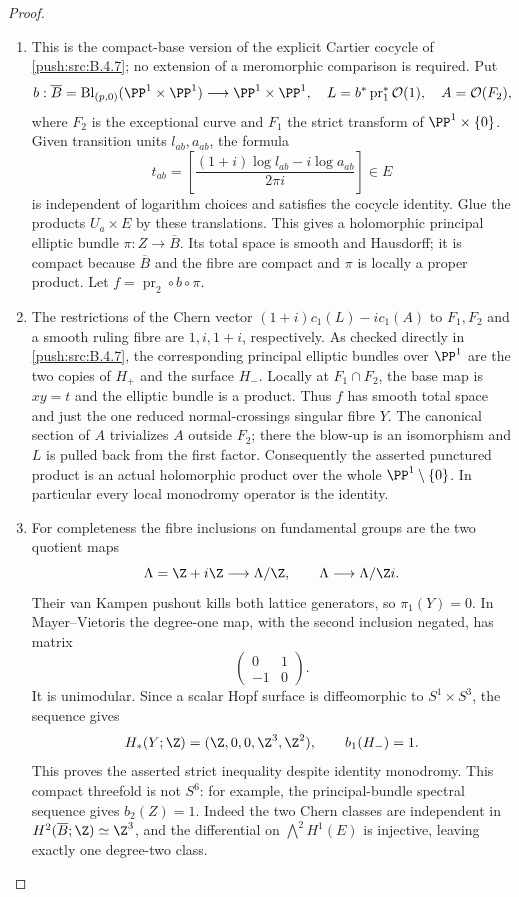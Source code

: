 \begin{proof}
\begin{enumerate}[label=\arabic*.,leftmargin=*]
\item This is the compact-base version of the explicit Cartier cocycle
of \ref{push:src:B.4.7}; no extension of a meromorphic comparison is required.
Put
\[
 b:\overline B=\operatorname{Bl}_{(p,0)}(\PP^1\times\PP^1)
      \longrightarrow\PP^1\times\PP^1,
 \quad L=b^*\operatorname{pr}_1^*\mathcal O(1),
 \quad A=\mathcal O(F_2),
\]
where $F_2$ is the exceptional curve and $F_1$ the strict transform
of $\PP^1\times\{0\}$.  Given transition units $l_{ab},a_{ab}$,
the formula
\[
 t_{ab}=\left[
 \frac{(1+i)\log l_{ab}-i\log a_{ab}}{2\pi i}
 \right]\in E
\]
is independent of logarithm choices and satisfies the cocycle
identity.  Glue the products $U_a\times E$ by these translations.
This gives a holomorphic principal elliptic bundle
$\pi:Z\to\overline B$.  Its total space is smooth and Hausdorff;
it is compact because $\overline B$ and the fibre are compact and
$\pi$ is locally a proper product.  Let
$f=\operatorname{pr}_2\circ b\circ\pi$.

\item The restrictions of the Chern vector
$(1+i)c_1(L)-i c_1(A)$ to $F_1,F_2$ and a smooth ruling fibre
are $1,i,1+i$, respectively.  As checked directly in \ref{push:src:B.4.7},
the corresponding principal elliptic bundles over $\PP^1$
are the two copies of $H_+$ and the surface $H_-$.  Locally
at $F_1\cap F_2$, the base map is $xy=t$ and the elliptic
bundle is a product.  Thus $f$ has smooth total space and just
the one reduced normal-crossings singular fibre $Y$.
The canonical section of $A$ trivializes $A$ outside $F_2$;
there the blow-up is an isomorphism and $L$ is pulled back
from the first factor.  Consequently the asserted punctured
product is an actual holomorphic product over the whole
$\PP^1\setminus\{0\}$.  In particular every local monodromy
operator is the identity.

\item For completeness the fibre inclusions on fundamental groups
are the two quotient maps
\[
 \Lambda=\Z+i\Z\longrightarrow\Lambda/\Z,
 \qquad
 \Lambda\longrightarrow\Lambda/\Z i.
\]
Their van Kampen pushout kills both lattice generators, so
$\pi_1(Y)=0$.  In Mayer--Vietoris the degree-one map, with
the second inclusion negated, has matrix
\[
 \begin{pmatrix}0&1\\-1&0\end{pmatrix}.
\]
It is unimodular.  Since a scalar Hopf surface is diffeomorphic
to $S^1\times S^3$, the sequence gives
\[
 H_*(Y;\Z)=(\Z,0,0,\Z^3,\Z^2),\qquad b_1(H_-)=1.
\]
This proves the asserted strict inequality despite identity
monodromy.  This compact threefold is not $S^6$: for example,
the principal-bundle spectral sequence gives $b_2(Z)=1$.
Indeed the two Chern classes are independent in
$H^2(\overline B;\Z)\simeq\Z^3$, and the differential on
$\bigwedge^2H^1(E)$ is injective, leaving exactly one
degree-two class.
\end{enumerate}
\end{proof}


